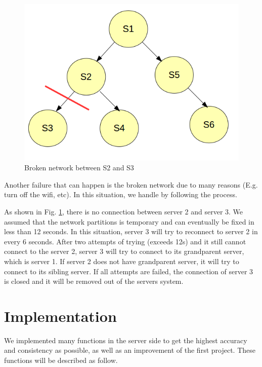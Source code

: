 \documentclass[10pt,twocolumn]{article}
\begin{document}
\begin{figure}[h!]
\begin{center}
\includegraphics[scale=0.4]{network_broken}
\caption{Broken network between S2 and S3}
\label{broken}	
\end{center}
\end{figure}

Another failure that can happen is the broken network due to many reasons (E.g. turn off the wifi, etc). In this situation, we handle by following the process. 

As shown in Fig. \ref{broken}, there is no connection between server 2 and server 3.  We assumed that the network partitions is temporary and can eventually be fixed in less than 12 seconds. In this situation, server 3 will try to reconnect to server 2 in every 6 seconds. After two attempts of trying (exceeds 12s) and it still cannot connect to the server 2, server 3 will try to connect to its grandparent server, which is server 1. If server 2 does not have grandparent server, it will try to connect to its sibling server. If all attempts are failed, the connection of server 3 is closed and it will be removed out of the servers system.

\section{Implementation}
We implemented many functions in the server side to get the highest accuracy and consistency as possible, as well as an improvement of the first project. These functions will be described as follow. \\
\end{document}
